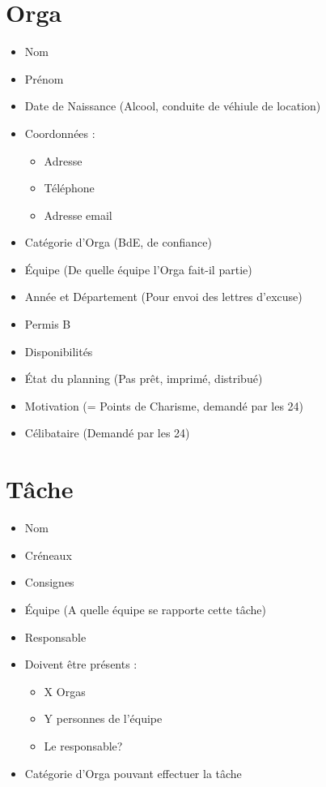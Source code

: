 \section{Orga}
\begin{itemize}
 \item Nom
\item Prénom
\item Date de Naissance (Alcool, conduite de véhiule de location)

\item Coordonnées : \begin{itemize}
                     \item Adresse
\item Téléphone
\item Adresse email
                    \end{itemize}
\item Catégorie d'Orga (BdE, de confiance)
\item Équipe (De quelle équipe l'Orga fait-il partie)
\item Année et Département (Pour envoi des lettres d'excuse)
\item Permis B

\item Disponibilités
\item État du planning (Pas prêt, imprimé, distribué)

\item Motivation (= Points de Charisme, demandé par les 24)
\item Célibataire (Demandé par les 24)

\end{itemize}

\section{Tâche}
\begin{itemize}
 \item Nom
\item Créneaux
\item Consignes

\item Équipe (A quelle équipe se rapporte cette tâche)
\item Responsable
\item Doivent être présents : \begin{itemize}
                               \item X Orgas
                               \item Y personnes de l'équipe
			       \item Le responsable?
                              \end{itemize}
\item Catégorie d'Orga pouvant effectuer la tâche


\end{itemize}